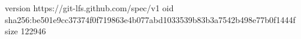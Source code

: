 version https://git-lfs.github.com/spec/v1
oid sha256:be501e9cc37374f0f719863e4b077abd1033539b83b3a7542b498e77b0f1444f
size 122946
